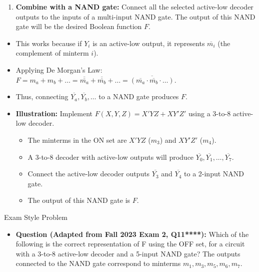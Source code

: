 \documentclass{article}
\begin{document}
\begin{itemize}
\begin{enumerate}
\end{enumerate}
\begin{enumerate}
\item \textbf{Combine with a NAND gate:} Connect all the selected active-low decoder outputs to the inputs of a multi-input NAND gate. The output of this NAND gate will be the desired Boolean function $F$.

\end{enumerate}
    \begin{itemize}
        \item This works because if $Y_i$ is an active-low output, it represents $\overline{m_i}$ (the complement of minterm $i$).
        \item Applying De Morgan's Law: $F = m_a + m_b + \dots = \overline{\overline{m_a}} + \overline{\overline{m_b}} + \dots = \overline{(\overline{m_a} \cdot \overline{m_b} \cdot \dots)}$.
        \item Thus, connecting $\overline{Y_a}, \overline{Y_b}, \dots$ to a NAND gate produces $F$.
    \end{itemize}

\begin{itemize}
    \item \textbf{Illustration:} Implement $F(X,Y,Z) = X'YZ + XY'Z'$ using a 3-to-8 active-low decoder.

        \begin{itemize}
            \item The minterms in the ON set are $X'YZ$ ($m_3$) and $XY'Z'$ ($m_4$).
            \item A 3-to-8 decoder with active-low outputs will produce $\overline{Y_0}, \overline{Y_1}, \dots, \overline{Y_7}$.
            \item Connect the active-low decoder outputs $\overline{Y_3}$ and $\overline{Y_4}$ to a 2-input NAND gate.
            \item The output of this NAND gate is $F$.
        \end{itemize}
\end{itemize}

Exam Style Problem

\begin{itemize}
    \item \textbf{Question (Adapted from Fall 2023 Exam 2, Q11****):} Which of the following is the correct representation of F using the OFF set, for a circuit with a 3-to-8 active-low decoder and a 5-input NAND gate? The outputs connected to the NAND gate correspond to minterms $m_1, m_3, m_5, m_6, m_7$.


\end{itemize}
\end{itemize}
\end{document}
